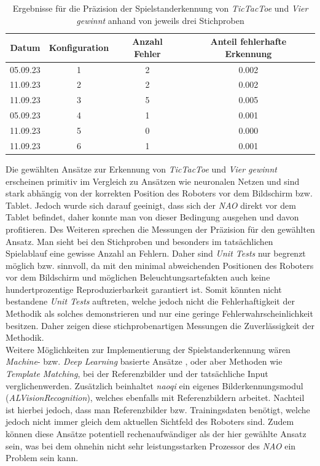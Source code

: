 \begin{table}[!htbp]
\centering
\begin{tabular}{|c|c|c|c|}
  \hline
Datum & Konfiguration &  Anzahl Fehler & Anteil fehlerhafte Erkennung \\
\hline
05.09.23 & 1 & 2 & 0.002\\
\hline
11.09.23 & 2 & 2 & 0.002\\
\hline
11.09.23 & 3 & 5& 0.005\\
\hline
05.09.23 & 4 & 1 &0.001 \\
\hline
11.09.23 & 5 & 0 & 0.000\\
\hline
11.09.23 & 6 & 1 & 0.001\\
\hline

\end{tabular}
\caption{Ergebnisse für die Präzision der Spielstanderkennung von \textit{TicTacToe} und \textit{Vier gewinnt} anhand von jeweils drei Stichproben}
\label{tab:vision_parameters}
\end{table} 

Die gewählten Ansätze zur Erkennung von \textit{TicTacToe} und \textit{Vier gewinnt} erscheinen primitiv im Vergleich zu Ansätzen wie neuronalen Netzen und sind stark abhängig von der korrekten Position des Roboters vor dem Bildschirm bzw. Tablet. Jedoch wurde sich darauf geeinigt, dass sich der \textit{NAO} direkt vor dem Tablet befindet, daher konnte man von dieser Bedingung ausgehen und davon profitieren. Des Weiteren sprechen die Messungen der Präzision für den gewählten Ansatz.  Man sieht bei den Stichproben und besonders im tatsächlichen Spielablauf eine gewisse Anzahl an Fehlern. Daher sind \textit{Unit Tests} nur begrenzt möglich bzw. sinnvoll, da mit den minimal abweichenden Positionen des Roboters vor dem Bildschirm und möglichen Beleuchtungsartefakten auch keine hundertprozentige Reproduzierbarkeit garantiert ist. Somit könnten nicht bestandene \textit{Unit Tests} auftreten, welche jedoch nicht die Fehlerhaftigkeit der Methodik als solches demonstrieren und nur eine geringe Fehlerwahrscheinlichkeit besitzen. Daher zeigen diese stichprobenartigen Messungen die Zuverlässigkeit der Methodik.\\
Weitere Möglichkeiten zur Implementierung der Spielstanderkennung wären \textit{Machine}- bzw. \textit{Deep Learning} basierte Ansätze \cite{deep_learning, cascade_classifier}, oder aber Methoden wie \textit{Template Matching}, bei der Referenzbilder und der tatsächliche Input \dq verglichen\dq werden\cite{template_matching}. Zusätzlich beinhaltet \textit{naoqi} ein eigenes Bilderkennungsmodul (\textit{ALVisionRecognition}), welches ebenfalls mit Referenzbildern arbeitet. Nachteil ist hierbei jedoch, dass man Referenzbilder bzw. Trainingsdaten benötigt, welche jedoch nicht immer gleich dem aktuellen Sichtfeld des Roboters sind. Zudem können diese Ansätze potentiell rechenaufwändiger als der hier gewählte Ansatz sein, was bei dem ohnehin nicht sehr leistungsstarken Prozessor des \textit{NAO} ein Problem sein kann.